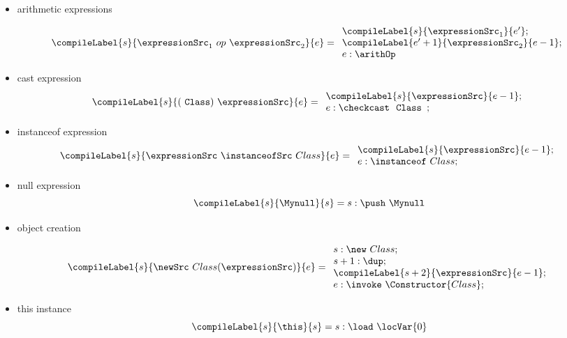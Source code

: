 \begin{itemize}
                
   \item arithmetic expressions
     
     $$\compileLabel{s}{ \expressionSrc_1 \ op \ \expressionSrc_2 }{e} = 
                 \begin{array}{l}
                       \compileLabel{s}{ \expressionSrc_1}{  e'  } ; \\
                       \compileLabel{e' + 1}{ \expressionSrc_2}{ e - 1  }; \\
                       e:\arithOp
                 \end{array}     
                $$ 
                       

   \item cast expression 
     $$ \compileLabel{s}{ (\mbox{ \rm \texttt{Class}}   ) \ \expressionSrc }{e} = 
              \begin{array}{l}  
                 \compileLabel{s}{\expressionSrc}{e  - 1};\\
                  e : \checkcast \ \mbox{ \rm \texttt{Class }} ;
              \end{array}
$$
	      

  \item instanceof expression
    $$ \compileLabel{s}{\expressionSrc \ \instanceofSrc \ Class }{e} = 
         \begin{array}{l}
              \compileLabel{s}{\expressionSrc}{ e  -1 };\\
               e : \instanceof \ Class;
         \end{array} $$

  \item null expression
    $$ \compileLabel{s}{\Mynull }{s } = s: \push \ \Mynull$$
          
 
 \item object creation
    
   $$\compileLabel{s}{ \newSrc \ Class (\expressionSrc ) }{e} =
                 \begin{array}{l}
                       s :    \new \ Class; \\ 
		       s + 1: \dup; \\
		       \compileLabel{s+2}{\expressionSrc}{e - 1 };\\
	               
		       e : \invoke \ \Constructor{Class};     
	       \end{array}$$
 		        
\item this instance
  $$\compileLabel{s}{\this}{s } = s:  \load \ \locVar{0}$$
              	              
\end{itemize}


